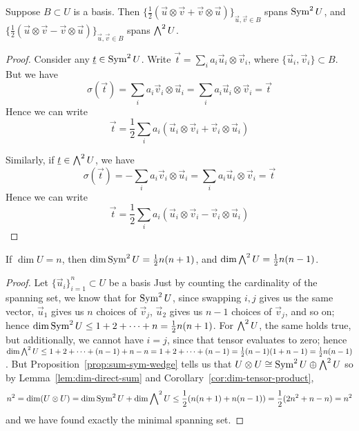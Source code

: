 \begin{proposition}
    Suppose \(B \subset U\) is a basis.
    Then \({\{\frac{1}{2}(\vec{u}\otimes\vec{v} + \vec{v}\otimes\vec{u})\}}_{\vec{u},\vec{v} \in B}\)
    spans \(\operatorname{Sym}^2 U\),
    and \({\{\frac{1}{2}(\vec{u}\otimes\vec{v} - \vec{v}\otimes\vec{u})\}}_{\vec{u},\vec{v} \in B}\)
    spans \(\operatorname{{\bigwedge}}^2 U\).
\end{proposition}
\begin{proof}
    Consider any \(\underline{t} \in \operatorname{Sym}^2 U\).
    Write \(\vec{t} = \sum_i a_i\vec{u}_i\otimes\vec{v}_i\),
    where \(\{\vec{u}_i,\vec{v}_i\} \subset B\).
    But we have
    \begin{equation*}
        \sigma(\vec{t}) = \sum_i a_i\vec{v}_i\otimes\vec{u}_i
        = \sum_i a_i\vec{u}_i\otimes\vec{v}_i = \vec{t}
    \end{equation*}
    Hence we can write
    \begin{equation*}
        \vec{t} = \frac{1}{2} \sum_i a_i(\vec{u}_i\otimes\vec{v}_i + \vec{v}_i\otimes\vec{u}_i)
    \end{equation*}

    Similarly, if \(\underline{t} \in \operatorname{{\bigwedge}}^2 U\), we have
    \begin{equation*}
        \sigma(\vec{t}) = -\sum_i a_i\vec{v}_i\otimes\vec{u}_i
        = \sum_i a_i\vec{u}_i\otimes\vec{v}_i = \vec{t}
    \end{equation*}
    Hence we can write
    \begin{equation*}
        \vec{t} = \frac{1}{2} \sum_i a_i(\vec{u}_i\otimes\vec{v}_i - \vec{v}_i\otimes\vec{u}_i)
    \end{equation*}
\end{proof}
\begin{corollary}\label{cor:dim-sym-wedge}
    If \(\dim U = n\),
    then \(\dim \operatorname{Sym}^2 U = \frac{1}{2}n(n+1)\),
    and \(\dim \operatorname{{\bigwedge}}^2 U = \frac{1}{2}n(n-1)\).
\end{corollary}
\begin{proof}
    Let \({\{\vec{u}_i\}}_{i=1}^n \subset U\) be a basis
    Just by counting the cardinality of the spanning set,
    we know that for \(\operatorname{Sym}^2 U\),
    since swapping \(i,j\) gives us the same vector,
    \(\vec{u}_1\) gives us \(n\) choices of \(\vec{v}_j\),
    \(\vec{u}_2\) gives us \(n-1\) choices of \(\vec{v}_j\),
    and so on;
    hence \(\dim \operatorname{Sym}^2 U \leq 1 + 2 + \cdots + n = \frac{1}{2}n(n+1)\).
    For \(\operatorname{{\bigwedge}}^2 U\),
    the same holds true, but additionally, we cannot have \(i = j\),
    since that tensor evaluates to zero;
    hence \(\dim \operatorname{{\bigwedge}}^2 U \leq 1 + 2 + \cdots + (n-1) + n - n
    = 1 + 2 + \cdots + (n-1) = \frac{1}{2}(n-1)(1+n-1) = \frac{1}{2}n(n-1)\).
    But Proposition~\ref{prop:sum-sym-wedge} tells us that
    \(U \otimes U \cong \operatorname{Sym}^2 U \oplus \operatorname{{\bigwedge}}^2 U\)
    so by Lemma~\ref{lem:dim-direct-sum} and Corollary~\ref{cor:dim-tensor-product},
    \begin{equation*}
        n^2 = \dim(U \otimes U) = \dim \operatorname{Sym}^2 U + \dim \operatorname{{\bigwedge}}^2 U
        \leq \frac{1}{2}(n(n+1) + n(n-1)) = \frac{1}{2}(2n^2 + n - n) = n^2
    \end{equation*}
    and we have found exactly the minimal spanning set.
\end{proof}
